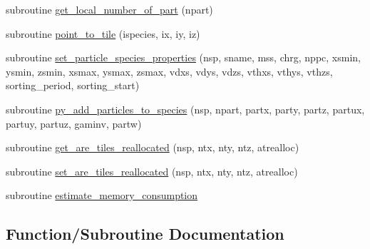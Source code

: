 \begin{DoxyCompactItemize}
\item 
subroutine \hyperlink{namespacetiling_af9f6fdf5c755688f10dc74ed3c363d85}{get\+\_\+local\+\_\+number\+\_\+of\+\_\+part} (npart)
\item 
subroutine \hyperlink{namespacetiling_a875e1671637fb100355fe099ef2a4f63}{point\+\_\+to\+\_\+tile} (ispecies, ix, iy, iz)
\item 
subroutine \hyperlink{namespacetiling_a832a380c64af7fb0611b3528b1b28ef2}{set\+\_\+particle\+\_\+species\+\_\+properties} (nsp, sname, mss, chrg, nppc, xsmin, ysmin, zsmin, xsmax, ysmax, zsmax, vdxs, vdys, vdzs, vthxs, vthys, vthzs, sorting\+\_\+period, sorting\+\_\+start)
\item 
subroutine \hyperlink{namespacetiling_a7d2954e264909ff996bff6096932a53d}{py\+\_\+add\+\_\+particles\+\_\+to\+\_\+species} (nsp, npart, partx, party, partz,                                                       partux, partuy, partuz, gaminv, partw)
\item 
subroutine \hyperlink{namespacetiling_a74f93e807809bce73965e51431a8f8c7}{get\+\_\+are\+\_\+tiles\+\_\+reallocated} (nsp, ntx, nty, ntz, atrealloc)
\item 
subroutine \hyperlink{namespacetiling_a9ac073551919a3ca368f58e56b9370e6}{set\+\_\+are\+\_\+tiles\+\_\+reallocated} (nsp, ntx, nty, ntz, atrealloc)
\item 
subroutine \hyperlink{namespacetiling_a535146a13d8c0743eba14d150ca49199}{estimate\+\_\+memory\+\_\+consumption}
\end{DoxyCompactItemize}


\subsection{Function/\+Subroutine Documentation}
